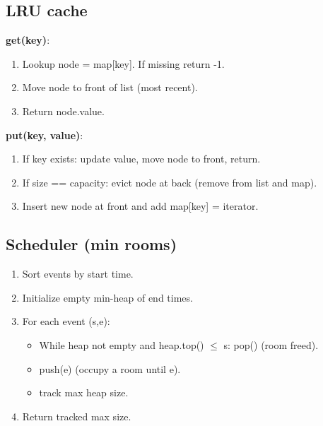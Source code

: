 \documentclass[11pt,a4paper]{article}
\begin{document}
\subsection{LRU cache}
\begin{tcolorbox}[mybox,title=LRU operations (pseudocode)]
\small
\textbf{get(key)}:
\begin{enumerate}
  \item Lookup node = map[key]. If missing return -1.
  \item Move node to front of list (most recent).
  \item Return node.value.
\end{enumerate}

\textbf{put(key, value)}:
\begin{enumerate}
  \item If key exists: update value, move node to front, return.
  \item If size == capacity: evict node at back (remove from list and map).
  \item Insert new node at front and add map[key] = iterator.
\end{enumerate}
\end{tcolorbox}

\subsection{Scheduler (min rooms)}
\begin{tcolorbox}[mybox,title=Interval partitioning (pseudocode)]
\small
\begin{enumerate}
  \item Sort events by start time.
  \item Initialize empty min-heap of end times.
  \item For each event (s,e):
    \begin{itemize}
      \item While heap not empty and heap.top() $\le$ s: pop() (room freed).
      \item push(e) (occupy a room until e).
      \item track max heap size.
    \end{itemize}
  \item Return tracked max size.
\end{enumerate}
\end{tcolorbox}
\end{document}
